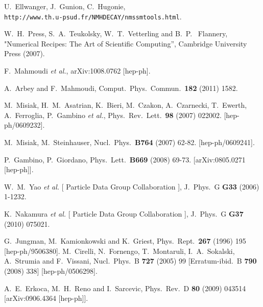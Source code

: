 \documentclass[12pt,a4paper]{article}
\begin{document}
\begin{thebibliography}{}
  U.~Ellwanger, J.~Gunion, C.~Hugonie,\\
  \verb|http://www.th.u-psud.fr/NMHDECAY/nmssmtools.html|.


W.~H.~Press, S.~A.~Teukolsky,
W.~T.~Vetterling and  B.~P.~ Flannery,  
"Numerical Recipes: The Art of Scientific Computing'', Cambridge University
Press (2007).

  F.~Mahmoudi {\it et al.},
  arXiv:1008.0762 [hep-ph].

  A.~Arbey and F.~Mahmoudi,
  Comput.\ Phys.\ Commun.\  {\bf 182} (2011) 1582.

  M.~Misiak, H.~M.~Asatrian, K.~Bieri, M.~Czakon, A.~Czarnecki, T.~Ewerth, A.~Ferroglia, P.~Gambino {\it et al.},
  Phys.\ Rev.\ Lett.\  {\bf 98 } (2007)  022002.
  [hep-ph/0609232].

  M.~Misiak, M.~Steinhauser,
  Nucl.\ Phys.\  {\bf B764 } (2007)  62-82.
  [hep-ph/0609241].

  P.~Gambino, P.~Giordano,
  Phys.\ Lett.\  {\bf B669 } (2008)  69-73.
  [arXiv:0805.0271 [hep-ph]].

  W.~M.~Yao {\it et al.} [ Particle Data Group Collaboration ],
  J.\ Phys.\ G {\bf G33 } (2006)  1-1232.

  K.~Nakamura {\it et al.} [ Particle Data Group Collaboration ],
  J.\ Phys.\ G {\bf G37 } (2010)  075021.
  
  G.~Jungman, M.~Kamionkowski and K.~Griest,
  Phys.\ Rept.\  {\bf 267} (1996) 195
  [hep-ph/9506380].
  M.~Cirelli, N.~Fornengo, T.~Montaruli, I.~A.~Sokalski, A.~Strumia and
F.~Vissani,
  Nucl.\ Phys.\ B {\bf 727} (2005) 99
   [Erratum-ibid.\ B {\bf 790} (2008) 338]
  [hep-ph/0506298].


  A.~E.~Erkoca, M.~H.~Reno and I.~Sarcevic,
  Phys.\ Rev.\ D {\bf 80} (2009) 043514
  [arXiv:0906.4364 [hep-ph]].

  
\end{thebibliography}
\end{document}
